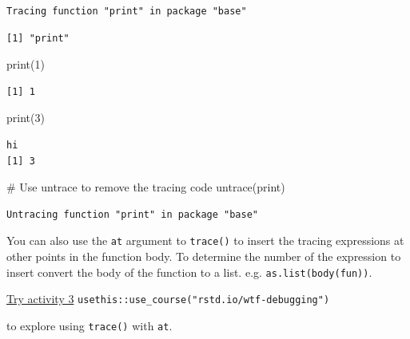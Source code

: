 \documentclass[
  letterpaper,
]{book}
\newenvironment{Shaded}{\begin{snugshade}}{\end{snugshade}}
\newcommand{\CommentTok}[1]{\textcolor[rgb]{0.37,0.37,0.37}{#1}}
\newcommand{\DecValTok}[1]{\textcolor[rgb]{0.68,0.00,0.00}{#1}}
\newcommand{\FunctionTok}[1]{\textcolor[rgb]{0.28,0.35,0.67}{#1}}
\newcommand{\NormalTok}[1]{\textcolor[rgb]{0.00,0.23,0.31}{#1}}
\begin{document}
\begin{verbatim}
Tracing function "print" in package "base"
\end{verbatim}

\begin{verbatim}
[1] "print"
\end{verbatim}

\begin{Shaded}
\begin{Highlighting}[]
\FunctionTok{print}\NormalTok{(}\DecValTok{1}\NormalTok{)}
\end{Highlighting}
\end{Shaded}

\begin{verbatim}
[1] 1
\end{verbatim}

\begin{Shaded}
\begin{Highlighting}[]
\FunctionTok{print}\NormalTok{(}\DecValTok{3}\NormalTok{)}
\end{Highlighting}
\end{Shaded}

\begin{verbatim}
hi
[1] 3
\end{verbatim}

\begin{Shaded}
\begin{Highlighting}[]
\CommentTok{\# Use untrace to remove the tracing code}
\FunctionTok{untrace}\NormalTok{(print)}
\end{Highlighting}
\end{Shaded}

\begin{verbatim}
Untracing function "print" in package "base"
\end{verbatim}

You can also use the \texttt{at} argument to \texttt{trace()} to insert
the tracing expressions at other points in the function body. To
determine the number of the expression to insert convert the body of the
function to a list. e.g. \texttt{as.list(body(fun))}.

\begin{rmdinfo}
\href{https://raw.githubusercontent.com/jimhester/wtf-debugging/master/03_debugging_spartan.R}{Try
activity 3} \texttt{usethis::use\_course("rstd.io/wtf-debugging")}

to explore using \texttt{trace()} with \texttt{at}.
\end{rmdinfo}
\end{document}
